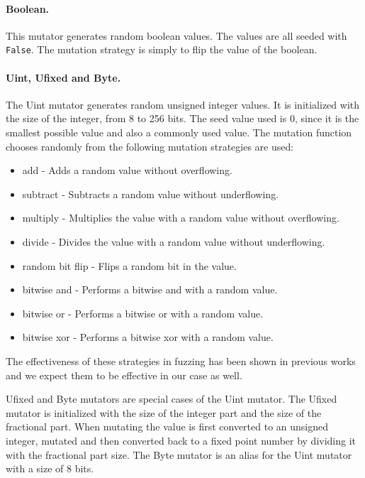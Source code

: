 \paragraph{Boolean.} This mutator generates random boolean values. The values are all seeded with \texttt{False}.
The mutation strategy is simply to flip the value of the boolean.

\paragraph{Uint, Ufixed and Byte.}
The Uint mutator generates random unsigned integer values. It is initialized with the size of the integer, from 8 to 256 bits. The seed value used is 0, since it is the smallest possible value and also a commonly used value. The mutation function chooses randomly from the following mutation strategies are used:
\begin{itemize}
    \item add - Adds a random value without overflowing.
    \item subtract - Subtracts a random value without underflowing.
    \item multiply - Multiplies the value with a random value without overflowing.
    \item divide - Divides the value with a random value without underflowing.
    \item random bit flip - Flips a random bit in the value.
    \item bitwise and - Performs a bitwise and with a random value.
    \item bitwise or - Performs a bitwise or with a random value.
    \item bitwise xor - Performs a bitwise xor with a random value.
\end{itemize}
The effectiveness of these strategies in fuzzing has been shown in previous works and we expect them to be effective in our case as well.

Ufixed and Byte mutators are special cases of the Uint mutator. The Ufixed mutator is initialized with the size of the integer part and the size of the fractional part. When mutating the value is first converted to an unsigned integer, mutated and then converted back to a fixed point number by dividing it with the fractional part size. The Byte mutator is an alias for the Uint mutator with a size of 8 bits.

